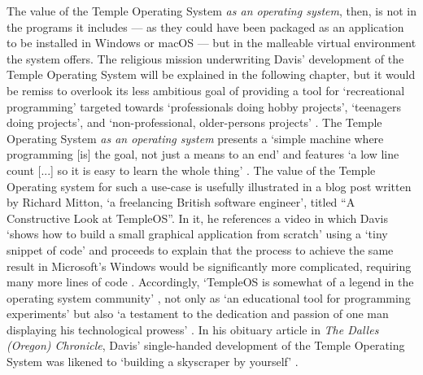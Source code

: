 \documentclass[Draft.tex]{subfiles}
\begin{document}
The value of the Temple Operating System \textit{as an operating system},
then, is not in the programs it includes --- as they could have
been packaged as an application to be installed in Windows or macOS ---
but in the malleable virtual environment the system offers.
The religious mission underwriting Davis' development of the
Temple Operating System will be explained in the following chapter,
but it would be remiss to overlook its less ambitious goal of providing
a tool for `recreational programming' targeted towards
`professionals doing hobby projects', `teenagers doing projects',
and `non-professional, older-persons projects' \parencite{Welcome}.
The Temple Operating System \textit{as an operating system} presents a
`simple machine where programming [is] the goal, not just a means
to an end' and features `a low line count [...]
so it is easy to learn the whole thing' \parencite{Charter}.
The value of the Temple Operating system for such a use-case is
usefully illustrated in a blog post written by Richard Mitton,
`a freelancing British software engineer', titled
``A Constructive Look at TempleOS''.
In it, he references a video in which Davis `shows how to build a small
graphical application from scratch' using a `tiny snippet of code'
and proceeds to explain that the process to achieve the same result
in Microsoft's Windows would be significantly more
complicated, requiring many more lines of code \parencite{CodersNotes}.
Accordingly, `TempleOS is somewhat of a legend in the
operating system community' \parencite{CodersNotes}, not only as
`an educational tool for programming experiments' but also
`a testament to the dedication and passion of one man
displaying his technological prowess' \parencite{TechRepublic}.
In his obituary article in \textit{The Dalles (Oregon) Chronicle},
Davis' single-handed development of the Temple Operating System was likened to
`building a skyscraper by yourself' \parencite{Cecil18}.
\end{document}
